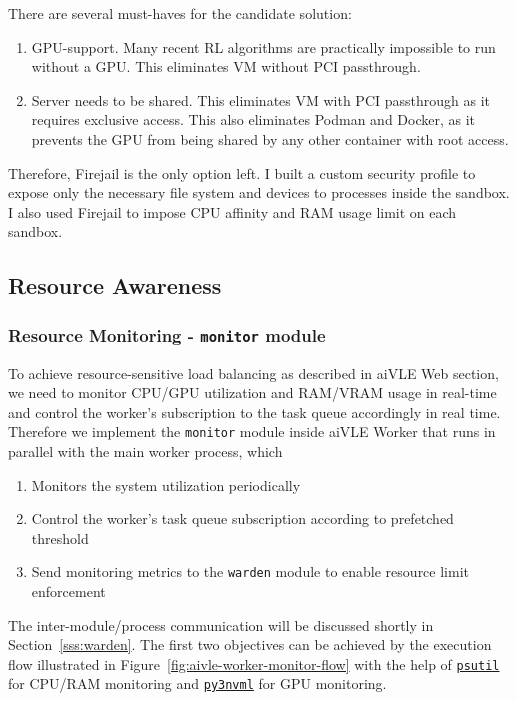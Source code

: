 There are several must-haves for the candidate solution:

\begin{enumerate}
    \item GPU-support. Many recent RL algorithms are practically impossible to run without a GPU. This eliminates VM without PCI passthrough.
    \item Server needs to be shared. This eliminates VM with PCI passthrough as it requires exclusive access. This also eliminates Podman and Docker, as it prevents the GPU from being shared by any other container with root access.
\end{enumerate}

Therefore, Firejail is the only option left. I built a custom security profile to expose only the necessary file system and devices to processes inside the sandbox. I also used Firejail to impose CPU affinity and RAM usage limit on each sandbox.

\subsection{Resource Awareness}
\label{ss:aivle-worker-resource-awareness}
\subsubsection{Resource Monitoring - \texttt{monitor} module}
\label{sss:monitor}
To achieve resource-sensitive load balancing as described in aiVLE Web section, we need to monitor CPU/GPU utilization and RAM/VRAM usage in real-time and control the worker's subscription to the task queue accordingly in real time. Therefore we implement the \texttt{monitor} module inside aiVLE Worker that runs in parallel with the main worker process, which
\begin{enumerate}
    \item Monitors the system utilization periodically
    \item Control the worker's task queue subscription according to prefetched threshold
    \item Send monitoring metrics to the \texttt{warden} module to enable resource limit enforcement
\end{enumerate}

The inter-module/process communication will be discussed shortly in Section~\ref{sss:warden}. The first two objectives can be achieved by the execution flow illustrated in Figure~\ref{fig:aivle-worker-monitor-flow} with the help of \href{https://pypi.org/project/psutil/}{\texttt{psutil}} for CPU/RAM monitoring and \href{https://github.com/fbcotter/py3nvml}{\texttt{py3nvml}} for GPU monitoring.

